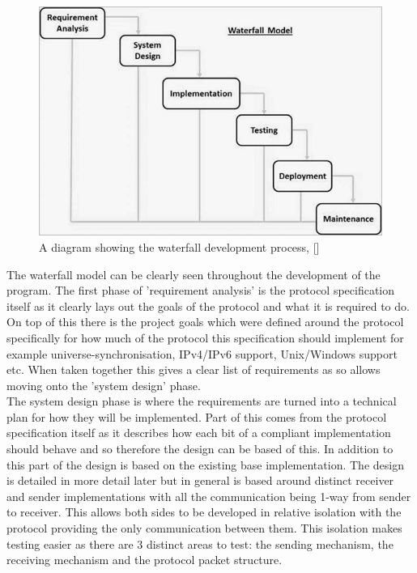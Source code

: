 \documentclass[11pt,a4paper]{article}
\begin{document}
\begin{figure}
\label{waterfall-diag}
\includegraphics[width=\textwidth]{sdlc_waterfall_model.jpg}
\caption{A diagram showing the waterfall development process, [\cite{waterfall-diagram}]}
\end{figure}

The waterfall model can be clearly seen throughout the development of the program. The first phase of 'requirement analysis' is the protocol specification itself as it clearly lays out the goals of the protocol and what it is required to do. On top of this there is the project goals which were defined around the protocol specifically for how much of the protocol this specification should implement for example universe-synchronisation, IPv4/IPv6 support, Unix/Windows support etc. When taken together this gives a clear list of requirements as so allows moving onto the 'system design' phase.\\

The system design phase is where the requirements are turned into a technical plan for how they will be implemented. Part of this comes from the protocol specification itself as it describes how each bit of a compliant implementation should behave and so therefore the design can be based of this. In addition to this part of the design is based on the existing base implementation. The design is detailed in more detail later but in general is based around distinct receiver and sender implementations with all the communication being 1-way from sender to receiver. This allows both sides to be developed in relative isolation with the protocol providing the only communication between them. This isolation makes testing easier as there are 3 distinct areas to test: the sending mechanism, the receiving mechanism and the protocol packet structure.\\
\end{document}
